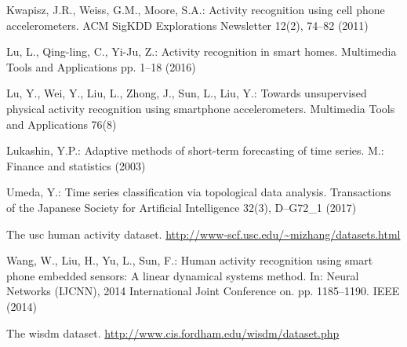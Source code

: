\documentclass{llncs}
\begin{document}
\begin{thebibliography}{10}
	Kwapisz, J.R., Weiss, G.M., Moore, S.A.: Activity recognition using cell phone
	accelerometers. ACM SigKDD Explorations Newsletter  12(2),  74--82 (2011)
	
	Lu, L., Qing-ling, C., Yi-Ju, Z.: Activity recognition in smart homes.
	Multimedia Tools and Applications pp. 1--18 (2016)
	
	Lu, Y., Wei, Y., Liu, L., Zhong, J., Sun, L., Liu, Y.: Towards unsupervised
	physical activity recognition using smartphone accelerometers. Multimedia
	Tools and Applications  76(8)
	
	Lukashin, Y.P.: Adaptive methods of short-term forecasting of time series. M.:
	Finance and statistics  (2003)
	
	Umeda, Y.: Time series classification via topological data analysis.
	Transactions of the Japanese Society for Artificial Intelligence  32(3),
	D--G72\_1 (2017)
	
	The usc human activity dataset.
	\url{http://www-scf.usc.edu/~mizhang/datasets.html}
	
	Wang, W., Liu, H., Yu, L., Sun, F.: Human activity recognition using smart
	phone embedded sensors: A linear dynamical systems method. In: Neural
	Networks (IJCNN), 2014 International Joint Conference on. pp. 1185--1190.
	IEEE (2014)
	
	The wisdm dataset. \url{http://www.cis.fordham.edu/wisdm/dataset.php}
	
\end{thebibliography}
\end{document}
